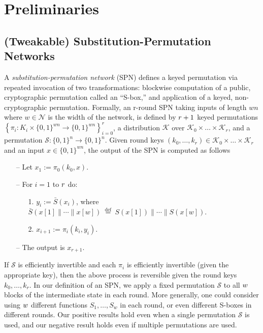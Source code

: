 

\section{Preliminaries}
\label{section:preliminary}


\subsection{(Tweakable) Substitution-Permutation Networks}
A \emph{substitution-permutation network }(SPN) defines a keyed permutation via repeated invocation of two transformations: blockwise computation of a public, cryptographic permutation called an ``S-box,'' and application of a keyed, non-cryptographic permutation. Formally, an r-round SPN taking inputs of length $w n$ where $w \in \mathcal{N}$ is the width of the network, is defined by $\mathnormal{r}+1$ keyed permutations $\left\{\pi_{i}: K_{i} \times\{0,1\}^{w n} \rightarrow\{0,1\}^{w n}\right\}_{i=0}^{r}$, a distribution $\mathcal{K}$ over $\mathcal{K}_{0} \times \dots \times \mathcal{K}_{r}$, and a permutation $\mathcal{S}:\{0,1\}^{n} \rightarrow \{0,1\}^{n}$. Given round keys $(k_{0},\dots, k_{r}) \in \mathcal{K}_{0} \times \dots \times \mathcal{K}_{r}$ and an input $x \in \{0,1\}^{w n}$, the output of the SPN is computed as follows

\begin{itemize}
  \item[--]
  Let $x_{1} := \pi_{0}(k_{0},x)$.
  \item[--]
  For $i = 1$ to $\mathnormal{r}$ do:
  \begin{itemize}
    \item[1.]
    $y_{i} := \bar{S}(x_{i})$, where $\bar{S}(x[1]\|\cdots\| x[w]) \stackrel{\text { def }}{=} S(x[1])\|\cdots\| S(x[w])$.
    \item[2.]
    $x_{i + 1} := \pi_{i}(k_{i},y_{i})$.
  \end{itemize}
  \item[--]
  The output is $x_{r+1}$.
\end{itemize}

If $\mathcal{S}$ is efficiently invertible and each $\pi_{i}$ is efficiently invertible (given the appropriate key), then the above process is reversible given the round keys $k_{0}, \dots ,k_{r}$. In our definition of an SPN, we apply a fixed permutation $\mathcal{S}$ to all $\mathnormal{w}$ blocks of the intermediate state in each round. More generally, one could consider using $\mathnormal{w}$ different functions $S_{1}, \dots ,S_{w}$ in each round, or even different S-boxes in different rounds. Our positive results hold even when a single permutation $\mathcal{S}$ is used, and our negative result holds even if multiple permutations are used.\\


